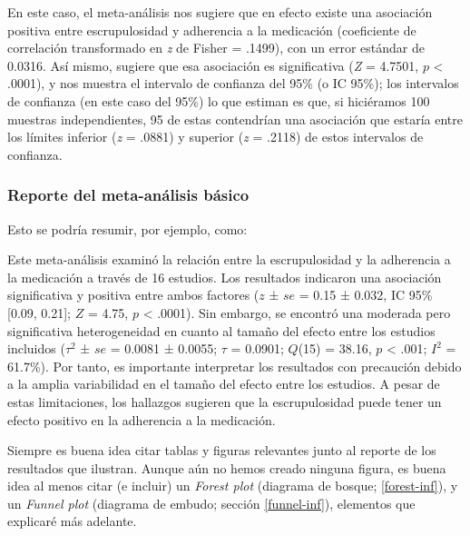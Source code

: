 \documentclass[
  bookmarksnumbered]{article}
\begin{document}
En este caso, el meta-análisis nos sugiere que en efecto existe una asociación positiva entre escrupulosidad y adherencia a la medicación (coeficiente de correlación transformado en \emph{z} de Fisher = .1499), con un error estándar de 0.0316. Así mismo, sugiere que esa asociación es significativa (\emph{Z} = 4.7501, \(p\) \textless{} .0001), y nos muestra el intervalo de confianza del 95\% (o IC 95\%); los intervalos de confianza (en este caso del 95\%) lo que estiman es que, si hiciéramos 100 muestras independientes, 95 de estas contendrían una asociación que estaría entre los límites inferior (\emph{z} = .0881) y superior (\emph{z} = .2118) de estos intervalos de confianza.

\hypertarget{reporte1}{%
\subsubsection{Reporte del meta-análisis básico}\label{reporte1}}

Esto se podría resumir, por ejemplo, como:

\begin{tcolorbox}[enhanced,attach boxed title to top center={yshift=-3mm,yshifttext=-1mm},
  colback=iacol!5!white,colframe=iacol!75!white,colbacktitle=iacol,
  title=Ejemplo de reporte básico,fonttitle=\bfseries,
  boxed title style={size=small,colframe=iacol} ]
  
Este meta-análisis examinó la relación entre la escrupulosidad y la adherencia a la medicación a través de 16 estudios. Los resultados indicaron una asociación significativa y positiva entre ambos factores ($z$ ± $se$ = 0.15 ± 0.032, IC 95\% [0.09, 0.21]; $Z$ = 4.75, $p$ < .0001). Sin embargo, se encontró una moderada pero significativa heterogeneidad en cuanto al tamaño del efecto entre los estudios incluidos ($\tau^2$ ± $se$ =  0.0081 ± 0.0055; $\tau$ = 0.0901; $Q$(15) =  38.16, $p$ < .001; $I^2$ = 61.7\%). Por tanto, es importante interpretar los resultados con precaución debido a la amplia variabilidad en el tamaño del efecto entre los estudios. A pesar de estas limitaciones, los hallazgos sugieren que la escrupulosidad puede tener un efecto positivo en la adherencia a la medicación.

\end{tcolorbox}

Siempre es buena idea citar tablas y figuras relevantes junto al reporte de los resultados que ilustran. Aunque aún no hemos creado ninguna figura, es buena idea al menos citar (e incluir) un \emph{Forest plot} (diagrama de bosque; \ref{forest-inf}), y un \emph{Funnel plot} (diagrama de embudo; sección \ref{funnel-inf}), elementos que explicaré más adelante.
\end{document}
